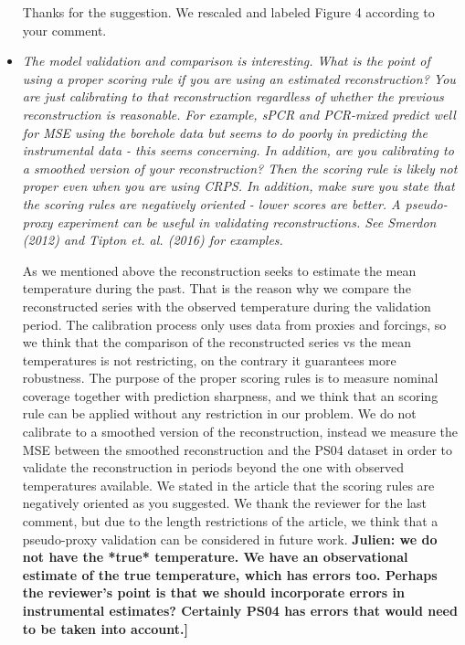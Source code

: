 \documentclass[11pt]{article}
\newcommand{\jeg}[1]{\color{blue}\textbf{Julien: #1]}\normalcolor}
\begin{document}
\begin{itemize}
  Thanks for the suggestion. We rescaled and labeled Figure 4 according to your comment.

  
\item \textit{The model validation and comparison is interesting. What is the
    point of using a proper scoring rule if you are using an estimated reconstruction? You are just calibrating to that reconstruction regardless of
whether the previous reconstruction is reasonable. For example, sPCR and
PCR-mixed predict well for MSE using the borehole data but seems to do poorly in
predicting the instrumental data - this seems concerning. In addition, are you
calibrating to a smoothed version of your reconstruction? Then the scoring rule
is likely not proper even when you are using CRPS. In addition, make sure you
state that the scoring rules are negatively oriented - lower scores are better.
A pseudo-proxy experiment can be useful in validating reconstructions. See Smerdon (2012) and Tipton et. al. (2016) for examples.
}

As we mentioned above the reconstruction seeks to estimate the mean
temperature during the past. That is the reason why we compare the reconstructed
series with the observed temperature during the validation period. The
calibration process only uses data from proxies and forcings, so we think that
the comparison of the reconstructed series vs the mean temperatures is not
restricting, on the contrary it guarantees more robustness. The purpose of the
proper scoring rules is to measure nominal coverage together with prediction
sharpness, and we think that an scoring rule can be applied without any
restriction in our problem. We do not calibrate to a smoothed version of the
reconstruction, instead we measure the MSE between the smoothed reconstruction
and the PS04 dataset in order to validate the reconstruction in periods beyond
the one with observed temperatures available. We stated in the article that the scoring rules
are negatively oriented as you suggested. We thank the reviewer for the last
comment, but due to the length restrictions of the
article, we think that a pseudo-proxy validation can be considered in future
work. 
\jeg{we do not have the *true* temperature. We have an observational estimate of the true temperature, which has errors too. Perhaps the reviewer's point is that we should incorporate errors in instrumental estimates? Certainly PS04 has errors that would need to be taken into account.}


\end{itemize}
\end{document}
